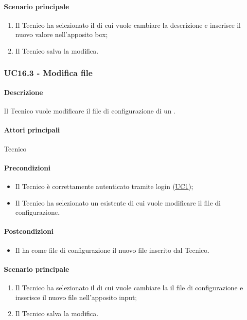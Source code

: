 \paragraph*{Scenario principale}
\begin{enumerate}
  \item Il Tecnico ha selezionato il  di cui vuole cambiare la descrizione e inserisce il nuovo valore nell’apposito box;
  \item Il Tecnico salva la modifica.
\end{enumerate}


\subsubsection{UC16.3 - Modifica file }\label{UC16point3}
\paragraph*{Descrizione}
Il Tecnico vuole modificare il file di configurazione di un .

\paragraph*{Attori principali}
Tecnico

\paragraph*{Precondizioni}
\begin{itemize}
  \item Il Tecnico è correttamente autenticato tramite login (\hyperref[UC1]{UC1});
  \item Il Tecnico ha selezionato un  esistente di cui vuole modificare il file di configurazione.
\end{itemize}

\paragraph*{Postcondizioni}
\begin{itemize}
  \item Il  ha come file di configurazione il nuovo file inserito dal Tecnico.
\end{itemize}

\paragraph*{Scenario principale}
\begin{enumerate}
  \item Il Tecnico ha selezionato il  di cui vuole cambiare la il file di configurazione e inserisce il nuovo file nell’apposito input;
  \item Il Tecnico salva la modifica.
\end{enumerate}
